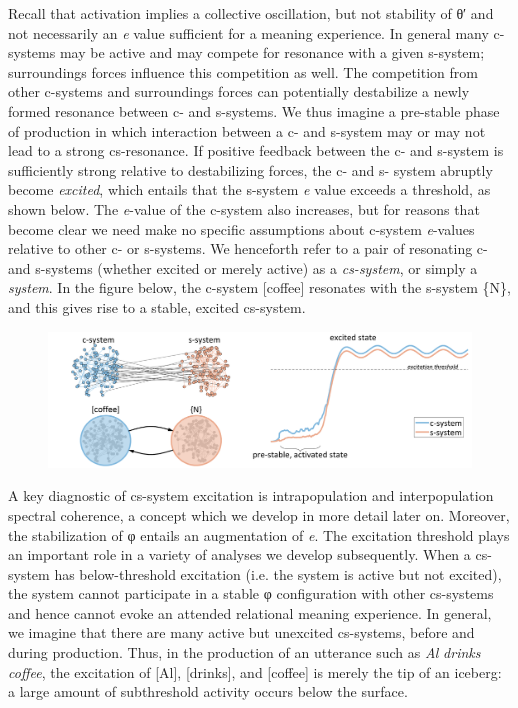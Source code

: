   Recall that activation implies a collective oscillation, but not stability of θ′ and not necessarily an \textit{e} value sufficient for a meaning experience. In general many c-systems may be active and may compete for resonance with a given s-system; surroundings forces influence this competition as well. The competition from other c-systems and surroundings forces can potentially destabilize a newly formed resonance between c- and s-systems. We thus imagine a pre-stable phase of production in which interaction between a c- and s-system may or may not lead to a strong cs-resonance. If positive feedback between the c- and s-system is sufficiently strong relative to destabilizing forces, the c- and s- system abruptly become \textit{excited}, which entails that the s-system \textit{e} value exceeds a threshold, as shown below. The \textit{e}{}-value of the c-system also increases, but for reasons that become clear we need make no specific assumptions about c-system \textit{e}{}-values relative to other c- or s-systems. We henceforth refer to a pair of resonating c- and s-systems (whether excited or merely active) as a \textit{cs-system}, or simply a \textit{system}. In the figure below, the c-system [coffee] resonates with the s-system \{N\}, and this gives rise to a stable, excited cs-system.

  
\begin{figure}
\includegraphics[width=\textwidth]{figures/Tilsen-img17.png}
\caption{\missingcaption}
\label{fig:}
\end{figure}
 

  A key diagnostic of cs-system excitation is intrapopulation and interpopulation spectral coherence, a concept which we develop in more detail later on. Moreover, the stabilization of φ entails an augmentation of \textit{e}. The excitation threshold plays an important role in a variety of analyses we develop subsequently. When a cs-system has below-threshold excitation (i.e. the system is active but not excited), the system cannot participate in a stable φ configuration with other cs-systems and hence cannot evoke an attended relational meaning experience. In general, we imagine that there are many active but unexcited cs-systems, before and during production. Thus, in the production of an utterance such as \textit{Al} \textit{drinks} \textit{coffee}, the excitation of [Al], [drinks], and [coffee] is merely the tip of an iceberg: a large amount of subthreshold activity occurs below the surface.

